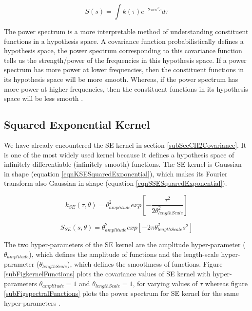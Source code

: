 \begin{equation}\label{eqCh4StationaryPowerSpectrum}
    S(s) = \int k(\tau) e^{-2 \pi is^{T} s}d\tau 
\end{equation}

The power spectrum is a more interpretable method of understanding constituent functions in a hypothesis space. A covariance function probabilistically defines a hypothesis space, the power spectrum corresponding to this covariance function tells us the strength/power of the frequencies in this hypothesis space. If a power spectrum has more power at lower frequencies, then the constituent functions in its hypothesis space will be more smooth. Whereas, if the power spectrum has more power at higher frequencies, then the constituent functions in its hypothesis space will be less smooth \cite{wilson2014thesis}. 

\subsection{Squared Exponential Kernel}\label{subSecCh4SEKernel}
We have already encountered the SE kernel in section \ref{subSecCH2Covariance}. It is one of the most widely used kernel because it defines a hypothesis space of infinitely differentiable (infinitely smooth) functions. The SE kernel is Gaussian in shape (equation \ref{eqnKSESquaredExponential}), which makes its Fourier transform also Gaussian in shape (equation \ref{eqnSSESquaredExponential}).  

\begin{equation}\label{eqnKSESquaredExponential}
k_{SE}(\tau, \theta) = \theta_{amplitude}^2exp \left [-\frac{\tau^2}{2\theta_{lengthScale}^2} \right ]
\end{equation}

\begin{equation}\label{eqnSSESquaredExponential}
S_{SE}(s, \theta) = \theta_{amplitude}^2  exp \left [-2\pi \theta_{lengthScale}^2 s^2 \right]
\end{equation}

The two hyper-parameters of the SE kernel are the amplitude hyper-parameter ($\theta_{amplitude}$), which defines the amplitude of functions and the length-scale hyper-parameter ($\theta_{lengthScale}$), which defines the smoothness of functions. Figure \ref{subFigkernelFunctions} plots the covariance values of SE kernel with hyper-parameters $\theta_{amplitude}=1$ and $\theta_{lengthScale}=1$, for varying values of $\tau$ whereas figure \ref{subFigspectralFunctions} plots the power spectrum for SE kernel for the same hyper-parameters . 

